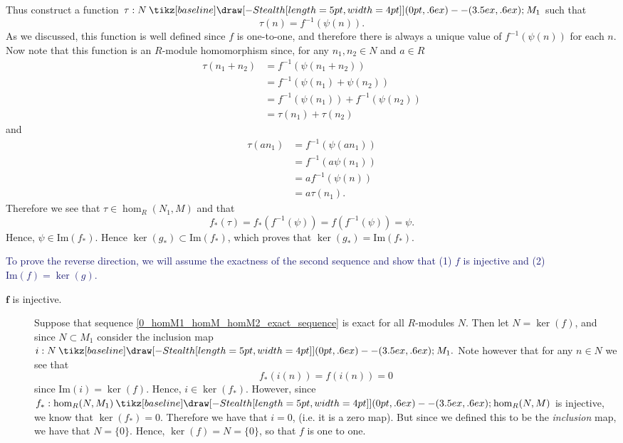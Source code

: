 \documentclass[12pt,letterpaper]{algebra_book}
\renewcommand{\to}{\mathbin{\tikz[baseline] \draw[-{Stealth[length=5pt,width=4pt]}] (0pt,.6ex) -- (3.5ex,.6ex);}}
\newcommand{\im}{\mbox{Im}}
\theoremstyle{definition}
\begin{document}
\begin{prf}
\begin{description}
            Thus construct a function $\tau: N \to M_1$ such that 
            \[
                \tau(n) = f^{-1}(\psi(n)).
            \]
            As we discussed, this function is well defined since
            $f$ is one-to-one, and therefore there is always a
            unique value of $f^{-1}(\psi(n))$ for each $n$. Now
            note that this function is an $R$-module homomorphism since, for
            any $n_1, n_2 \in N$ and $a \in R$  
            \begin{align*}
                \tau(n_1 + n_2) &=  f^{-1}(\psi(n_1 + n_2))\\
                &= f^{-1}(\psi(n_1) + \psi(n_2))\\
                &= f^{-1}(\psi(n_1)) + f^{-1}(\psi(n_2))\\
                &= \tau(n_1) + \tau(n_2)
            \end{align*}
            and 
            \begin{align*}
                \tau(an_1) &= f^{-1}(\psi(an_1))\\
                    &= f^{-1}(a\psi(n_1))\\
                    &= af^{-1}(\psi(n))\\
                    &= a\tau(n_1).
            \end{align*}
            Therefore we see that $\tau \in \hom_R(N_1, M)$ and that
            \[
                f_*(\tau) = f_*(f^{-1}(\psi)) = f(f^{-1}(\psi))= \psi.
            \]
            Hence, $\psi \in \im(f_*)$. Hence $\ker(g_*)
            \subset \im(f_*)$, which proves that $\ker(g_*) =
            \im(f_*)$.  
    \end{description}
    \textcolor{MidnightBlue}{To prove the reverse direction, we
    will assume the exactness of the second sequence and show that
    (1) $f$ is injective and (2) $\im(f) = \ker(g)$.}

    \begin{description}
        \item[$\bm{f}$ is injective.] Suppose that sequence
        \ref{0_homM1_homM_homM2_exact_sequence} is exact for all
        $R$-modules $N$. Then let $N = \ker(f)$, and since $N
        \subset M_1$ consider the
        inclusion map $i: N \to M_1.$  Note however that for any
        $n \in N$ we see that 
        \[
            f_*(i(n)) = f(i(n)) = 0
        \]
        since $\im(i) = \ker(f)$. Hence, $i \in \ker(f_*)$. 
        However, since $f_*: \hom_R(N,
        M_1) \to \hom_R(N, M)$ is injective, we know that
        $\ker(f_*) = 0$. Therefore we have that $i = 0$, (i.e. it
        is a zero map). But since we defined this to be the
        \textit{inclusion} map, we have that $N = \{0\}$. Hence,
        $\ker(f) = N = \{0\}$, so that $f$ is one to one.


\end{description}
\end{prf}
\end{document}
